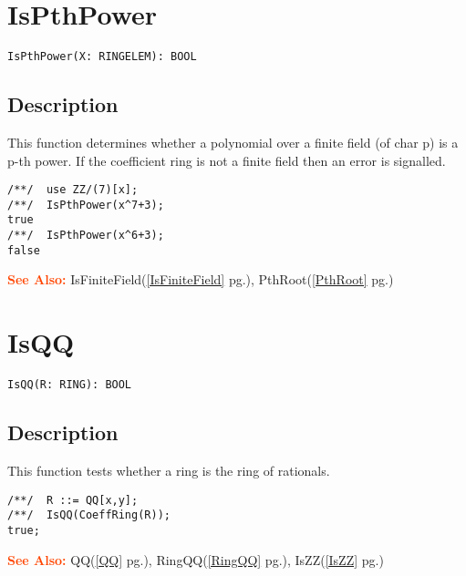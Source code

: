 \documentclass[a4paper]{mybook}
\newenvironment{command}{}{} %
\newcommand\SeeAlso{\par\textcolor{OrangeRed}{\textbf{\large See Also: }}}
\begin{document}
\section{IsPthPower}
\label{IsPthPower}
\begin{command} %


\begin{Verbatim}[label=syntax, rulecolor=\color{MidnightBlue},
frame=single]
IsPthPower(X: RINGELEM): BOOL
\end{Verbatim}


\subsection*{Description}

This function determines whether a polynomial over a finite
field (of char p) is a p-th power.
If the coefficient ring is not a finite field then an error is signalled.
\begin{Verbatim}[label=example, rulecolor=\color{PineGreen}, frame=single]
/**/  use ZZ/(7)[x];
/**/  IsPthPower(x^7+3);
true
/**/  IsPthPower(x^6+3);
false
\end{Verbatim}


\SeeAlso %
  IsFiniteField(\ref{IsFiniteField} pg.\pageref{IsFiniteField}), 
    PthRoot(\ref{PthRoot} pg.\pageref{PthRoot})
\end{command} %

\section{IsQQ}
\label{IsQQ}
\begin{command} %


\begin{Verbatim}[label=syntax, rulecolor=\color{MidnightBlue},
frame=single]
IsQQ(R: RING): BOOL
\end{Verbatim}


\subsection*{Description}

This function tests whether a ring is the ring of rationals.
\begin{Verbatim}[label=example, rulecolor=\color{PineGreen}, frame=single]
/**/  R ::= QQ[x,y];
/**/  IsQQ(CoeffRing(R));
true;
\end{Verbatim}


\SeeAlso %
  QQ(\ref{QQ} pg.\pageref{QQ}), 
    RingQQ(\ref{RingQQ} pg.\pageref{RingQQ}), 
    IsZZ(\ref{IsZZ} pg.\pageref{IsZZ})
\end{command} %
\end{document}
